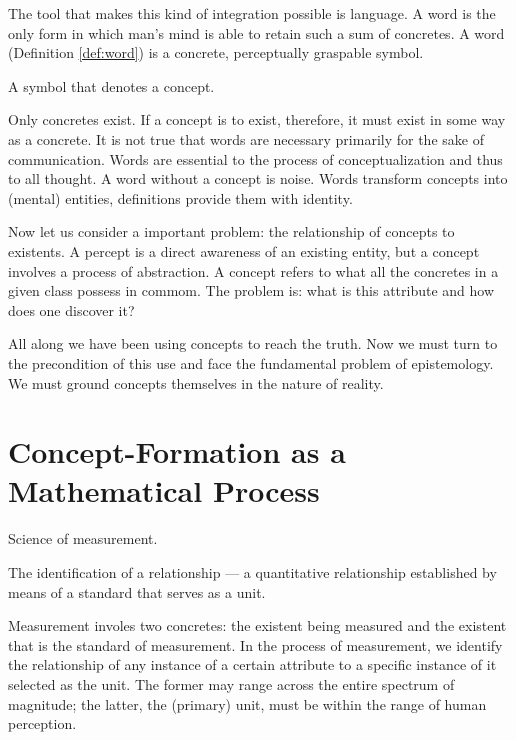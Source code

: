         The tool that makes this kind of integration possible is language. A word is the only form in which man's mind is able to retain such a sum of concretes. A word (Definition \ref{def:word}) is a concrete, perceptually graspable symbol.

            \begin{definition}[Word]
            \label{def:word}
                A symbol that denotes a concept.
            \end{definition}

        Only concretes exist. If a concept is to exist, therefore, it must exist in some way as a concrete. It is not true that words are necessary primarily for the sake of communication. Words are essential to the process of conceptualization and thus to all thought. A word without a concept is noise. Words transform concepts into (mental) entities, definitions provide them with identity.

        Now let us consider a important problem: the relationship of concepts to existents. A percept is a direct awareness of an existing entity, but a concept involves a process of abstraction. A concept refers to what all the concretes in a given class possess in commom. The problem is: what is this attribute and how does one discover it?

        All along we have been using concepts to reach the truth. Now we must turn to the precondition of this use and face the fundamental problem of epistemology. We must ground concepts themselves in the nature of reality.

    \section{Concept-Formation as a Mathematical Process}

            \begin{definition}[Mathematics]
            \label{def:mathematics}
                Science of measurement.
            \end{definition}

            \begin{definition}[Measurement]
            \label{def:measurement}
                The identification of a relationship — a quantitative relationship established by means of a standard that serves as a unit.
            \end{definition}

        Measurement involes two concretes: the existent being measured and the existent that is the standard of measurement. In the process of measurement, we identify the relationship of any instance of a certain attribute to a specific instance of it selected as the unit. The former may range across the entire spectrum of magnitude; the latter, the (primary) unit, must be within the range of human perception.

